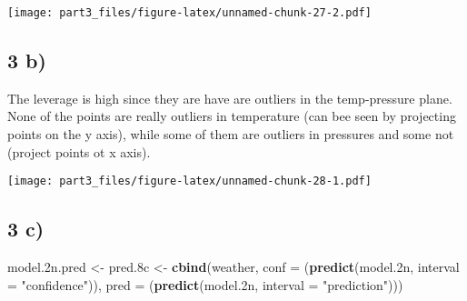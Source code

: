 \documentclass[]{article}
\newenvironment{Shaded}{\begin{snugshade}}{\end{snugshade}}
\newcommand{\DataTypeTok}[1]{\textcolor[rgb]{0.13,0.29,0.53}{#1}}
\newcommand{\FloatTok}[1]{\textcolor[rgb]{0.00,0.00,0.81}{#1}}
\newcommand{\KeywordTok}[1]{\textcolor[rgb]{0.13,0.29,0.53}{\textbf{#1}}}
\newcommand{\NormalTok}[1]{#1}
\newcommand{\OperatorTok}[1]{\textcolor[rgb]{0.81,0.36,0.00}{\textbf{#1}}}
\newcommand{\StringTok}[1]{\textcolor[rgb]{0.31,0.60,0.02}{#1}}
\begin{document}
\texttt{[image: part3\_files/figure-latex/unnamed-chunk-27-2.pdf]}

\hypertarget{b}{%
\subsection{3 b)}\label{b}}

The leverage is high since they are have are outliers in the
temp-pressure plane. None of the points are really outliers in
temperature (can bee seen by projecting points on the y axis), while
some of them are outliers in pressures and some not (project points ot x
axis).

\begin{Shaded}
\end{Shaded}

\texttt{[image: part3\_files/figure-latex/unnamed-chunk-28-1.pdf]}

\hypertarget{c}{%
\subsection{3 c)}\label{c}}

\begin{Shaded}
\begin{Highlighting}[]
\NormalTok{model}\FloatTok{.2}\NormalTok{n.pred <-}\StringTok{ }\NormalTok{pred}\FloatTok{.8}\NormalTok{c <-}\StringTok{ }\KeywordTok{cbind}\NormalTok{(weather, }
                 \DataTypeTok{conf =}\NormalTok{ (}\KeywordTok{predict}\NormalTok{(model}\FloatTok{.2}\NormalTok{n, }\DataTypeTok{interval =} \StringTok{"confidence"}\NormalTok{)),}
                 \DataTypeTok{pred =}\NormalTok{ (}\KeywordTok{predict}\NormalTok{(model}\FloatTok{.2}\NormalTok{n, }\DataTypeTok{interval =} \StringTok{"prediction"}\NormalTok{))) }
\end{Highlighting}
\end{Shaded}
\end{document}
